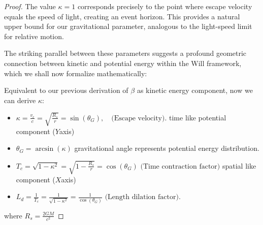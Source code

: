 \documentclass{article}
\begin{document}
\begin{proof}
The value $\kappa = 1$ corresponds precisely to the point where escape velocity equals the speed of light, creating an event horizon. This provides a natural upper bound for our gravitational parameter, analogous to the light-speed limit for relative motion.

The striking parallel between these parameters suggests a profound geometric connection between kinetic and potential energy within the Will framework, which we shall now formalize mathematically:

Equivalent to our previous derivation of $\beta$ as kinetic energy component, now we can derive $\kappa$:
\begin{itemize}
    \item  \textbf{$ \kappa =  \frac{v_e}{c} = \sqrt{\frac{R_s}{r}} =  \sin\left(\theta_G\right), \quad \text{(Escape velocity)}$}. time like potential component ($Y$axis) 
\end{itemize}
\begin{itemize}
    \item \textbf{$\theta_G = \arcsin(\kappa)$} gravitational angle represents potential energy distribution.
\end{itemize}
    \begin{itemize}
        \item   $T_c =\sqrt{1-\kappa^2}=\sqrt{1-\frac{R_s}{r}}  =\cos(\theta_G)\text{ (Time contraction factor)}$ spatial like component  ($X$axis) 
        \item $L_d =\frac{1}{T_c}=\frac{1}{\sqrt{1-\kappa^2} }=\frac{1}{\cos(\theta_G)}\text{ (Length dilation factor)}$.
    \end{itemize}
where $R_s = \frac{2GM}{c^2}$

\end{proof}
\end{document}
